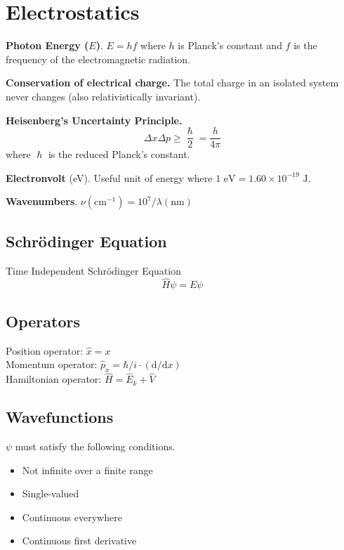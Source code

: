 
\section{Electrostatics}

\textbf{Photon Energy ($E$)}. $E = hf$ where
$h$ is Planck's constant and $f$ is the frequency of the electromagnetic
radiation.
\vspace{\baselineskip}

\textbf{Conservation of electrical charge.} The total charge in an isolated system never changes
(also relativistically invariant).
\vspace{\baselineskip}

\textbf{Heisenberg's Uncertainty Principle.} \begin{equation*} \Delta x \Delta p \geq \frac{\hslash}{2} =
  \frac{h}{4\pi} \end{equation*} where $\hslash$ is the reduced Planck's constant.
\vspace{\baselineskip}

\textbf{Electronvolt} (eV). Useful unit of energy where $1 \textrm{ eV} = 1.60 \times 10^{-19} \textrm{ J}$.
\vspace{\baselineskip}

\textbf{Wavenumbers}. $\nu(\mathrm{cm}^{-1}) = 10^7 / \lambda (\mathrm{nm})$
\vspace{\baselineskip}

\subsection*{Schrödinger Equation}
Time Independent Schrödinger Equation
\begin{equation*}
    \hat{H}\psi = E\psi
\end{equation*}

\subsection*{Operators}
Position operator: $\hat{x} = x$ \\
Momentum operator: $\hat{p}_x = \hbar/i \cdot (\mathrm{d}/\mathrm{d}x)$ \\
Hamiltonian operator: $\hat{H} = \hat{E}_k + \hat{V}$
\vspace{\baselineskip}

\subsection*{Wavefunctions}
$\psi$ must satisfy the following conditions.
\begin{itemize}
    \item Not infinite over a finite range
    \item Single-valued
    \item Continuous everywhere
    \item Continuous first derivative
\end{itemize}


